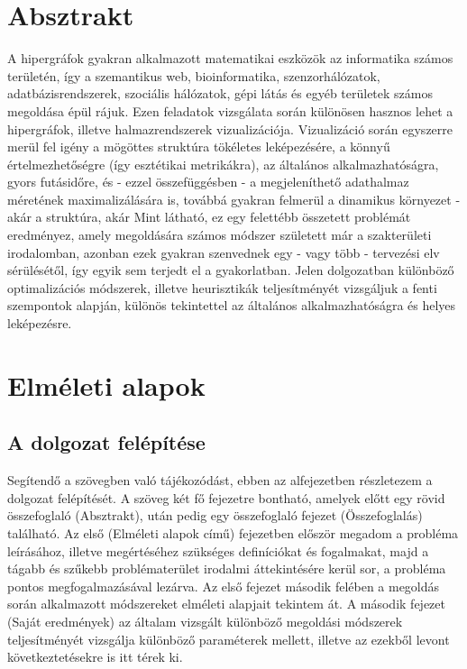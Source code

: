 \chapter{Absztrakt}

A hipergráfok gyakran alkalmazott matematikai eszközök az informatika számos területén, így a szemantikus web, bioinformatika, szenzorhálózatok, adatbázisrendszerek, szociális hálózatok, gépi látás és egyéb területek számos megoldása épül rájuk.
Ezen feladatok vizsgálata során különösen hasznos lehet a hipergráfok, illetve halmazrendszerek vizualizációja. Vizualizáció során egyszerre merül fel igény a mögöttes struktúra tökéletes leképezésére, a könnyű értelmezhetőségre (így esztétikai metrikákra), az általános alkalmazhatóságra, gyors futásidőre, és - ezzel összefüggésben - a megjeleníthető adathalmaz méretének maximalizálására is, továbbá gyakran felmerül a dinamikus környezet - akár a struktúra, akár 
Mint látható, ez egy felettébb összetett problémát eredményez, amely megoldására számos módszer született már a szakterületi irodalomban, azonban ezek gyakran szenvednek egy - vagy több - tervezési elv sérülésétől, így egyik sem terjedt el a gyakorlatban.
Jelen dolgozatban különböző optimalizációs módszerek, illetve heurisztikák teljesítményét vizsgáljuk a fenti szempontok alapján, különös tekintettel az általános alkalmazhatóságra és helyes leképezésre.


\chapter{Elméleti alapok}
\label{ch:intro}

\section{A dolgozat felépítése}

Segítendő a szövegben való tájékozódást, ebben az alfejezetben részletezem a dolgozat felépítését. A szöveg két fő fejezetre bontható, amelyek előtt egy rövid összefoglaló (Absztrakt), után pedig egy összefoglaló fejezet (Összefoglalás) található. Az első (Elméleti alapok című) fejezetben először megadom a probléma leírásához, illetve megértéséhez szükséges definíciókat és fogalmakat, majd a tágabb és szűkebb problématerület irodalmi áttekintésére kerül sor, a probléma pontos megfogalmazásával lezárva. Az első fejezet második felében a megoldás során alkalmazott módszereket elméleti alapjait tekintem át. A második fejezet (Saját eredmények) az általam vizsgált különböző megoldási módszerek teljesítményét vizsgálja különböző paraméterek mellett, illetve az ezekből levont következtetésekre is itt térek ki.


